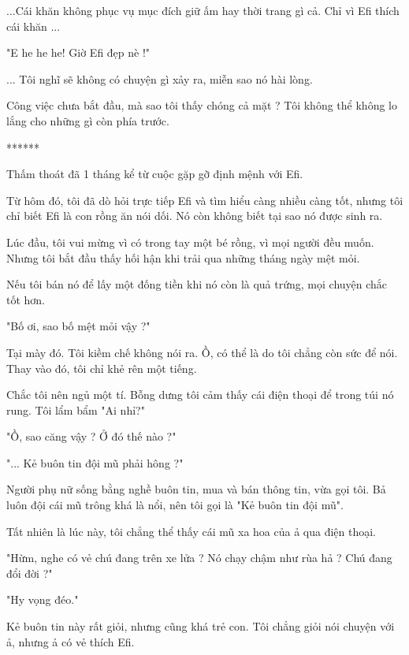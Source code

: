 ...Cái khăn không phục vụ mục đích giữ ấm hay thời trang gì cả. Chỉ vì Efi thích cái khăn ... 

"E he he he! Giờ Efi đẹp nè !"

... Tôi nghĩ sẽ không có chuyện gì xảy ra, miễn sao nó hài lòng.

Công việc chưa bắt đầu, mà sao tôi thấy chóng cả mặt ? Tôi không thể không lo lắng cho những gì còn phía trước.  \\
\begin{center}
	******
\end{center}

Thấm thoát đã 1 tháng kể từ cuộc gặp gỡ định mệnh với Efi. 

Từ hôm đó, tôi đã dò hỏi trực tiếp Efi và tìm hiểu càng nhiều càng tốt, nhưng tôi chỉ biết Efi là con rồng ăn nói dối. Nó còn không biết tại sao nó được sinh ra. 

Lúc đầu, tôi vui mừng vì có trong tay một bé rồng, vì mọi người đều muốn. Nhưng tôi bắt đầu thấy hối hận khi trải qua những tháng ngày mệt mỏi.

Nếu tôi bán nó để lấy một đống tiền khi nó còn là quả trứng, mọi chuyện chắc tốt hơn. 

"Bố ơi, sao bố mệt mỏi vậy ?"

Tại mày đó. Tôi kiềm chế không nói ra. Ồ, có thể là do tôi chẳng còn sức để nói. Thay vào đó, tôi chỉ khẻ rên một tiếng.

Chắc tôi nên ngủ một tí. Bỗng dưng tôi cảm thấy cái điện thoại để trong túi nó rung. Tôi lẩm bẩm "Ai nhỉ?"

"Ồ, sao căng vậy ? Ở đó thế nào ?"

"... Kẻ buôn tin đội mũ phải hông ?"

Người phụ nữ sống bằng nghề buôn tin, mua và bán thông tin, vừa gọi tôi. Bả luôn đội cái mũ trông khá là nổi, nên tôi gọi là "Kẻ buôn tin đội mũ".

Tất nhiên là lúc này, tôi chẳng thể thấy cái mũ xa hoa của ả qua điện thoại. 

"Hừm, nghe có vẻ chú đang trên xe lửa ? Nó chạy chậm như rùa hả ? Chú đang đổi đời ?"

"Hy vọng đéo."

Kẻ buôn tin này rất giỏi, nhưng cũng khá trẻ con. Tôi chẳng giỏi nói chuyện với ả, nhưng ả có vẻ thích Efi. 

